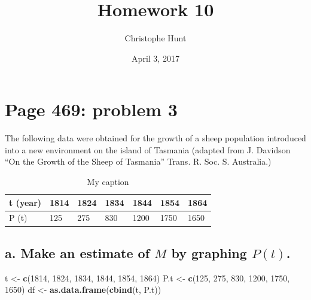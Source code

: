 \documentclass[]{article}
\title{Homework 10}
\author{Christophe Hunt}
\date{April 3, 2017}
\newenvironment{Shaded}{\begin{snugshade}}{\end{snugshade}}
\newcommand{\KeywordTok}[1]{\textcolor[rgb]{0.13,0.29,0.53}{\textbf{{#1}}}}
\newcommand{\DecValTok}[1]{\textcolor[rgb]{0.00,0.00,0.81}{{#1}}}
\newcommand{\StringTok}[1]{\textcolor[rgb]{0.31,0.60,0.02}{{#1}}}
\newcommand{\NormalTok}[1]{{#1}}
\begin{document}
\maketitle

{
\setcounter{tocdepth}{2}
\tableofcontents
}
\newpage

\section{Page 469: problem 3}\label{page-469-problem-3}

The following data were obtained for the growth of a sheep population
introduced into a new environment on the island of Tasmania (adapted
from J. Davidson ``On the Growth of the Sheep of Tasmania'' Trans. R.
Soc. S. Australia.)

\begin{table}[!h]
\centering
\caption{My caption}
\label{my-label}
\begin{tabular}{l|llllll}
t (year) & 1814 & 1824 & 1834 & 1844 & 1854 & 1864 \\ \hline
P (t) & 125 & 275 & 830 & 1200 & 1750 & 1650
\end{tabular}
\end{table}

\subsection{\texorpdfstring{a. Make an estimate of \(M\) by graphing
\(P(t)\).}{a. Make an estimate of M by graphing P(t).}}\label{a.-make-an-estimate-of-m-by-graphing-pt.}

\begin{Shaded}
\begin{Highlighting}[]
\NormalTok{t <-}\StringTok{ }\KeywordTok{c}\NormalTok{(}\DecValTok{1814}\NormalTok{, }\DecValTok{1824}\NormalTok{, }\DecValTok{1834}\NormalTok{, }\DecValTok{1844}\NormalTok{, }\DecValTok{1854}\NormalTok{, }\DecValTok{1864}\NormalTok{)}
\NormalTok{P.t <-}\StringTok{ }\KeywordTok{c}\NormalTok{(}\DecValTok{125}\NormalTok{, }\DecValTok{275}\NormalTok{, }\DecValTok{830}\NormalTok{, }\DecValTok{1200}\NormalTok{, }\DecValTok{1750}\NormalTok{, }\DecValTok{1650}\NormalTok{)}
\NormalTok{df <-}\StringTok{ }\KeywordTok{as.data.frame}\NormalTok{(}\KeywordTok{cbind}\NormalTok{(t, P.t))}
\end{Highlighting}
\end{Shaded}
\end{document}
